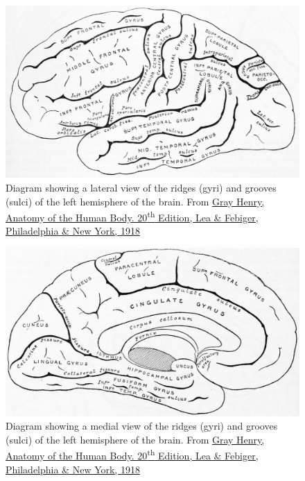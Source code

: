 \begin{figure}

{\centering \includegraphics[width=0.7\linewidth]{./figures/nervoussystem/GrayAnat1918p819} 

}

\caption{Diagram showing a lateral view of the ridges (gyri) and grooves (sulci) of the left hemisphere of the brain. From \href{https://archive.org/details/anatomyofhumanbo1918gray/page/n6/mode/2up}{Gray Henry, Anatomy of the Human Body. 20\textsuperscript{th} Edition, Lea \& Febiger, Philadelphia \& New York, 1918}}\label{fig:gyrilateral}
\end{figure}



\begin{figure}

{\centering \includegraphics[width=0.7\linewidth]{./figures/nervoussystem/GrayAnat1918p820} 

}

\caption{Diagram showing a medial view of the ridges (gyri) and grooves (sulci) of the left hemisphere of the brain. From \href{https://archive.org/details/anatomyofhumanbo1918gray/page/n6/mode/2up}{Gray Henry, Anatomy of the Human Body. 20\textsuperscript{th} Edition, Lea \& Febiger, Philadelphia \& New York, 1918}}\label{fig:gyrimedial}
\end{figure}




